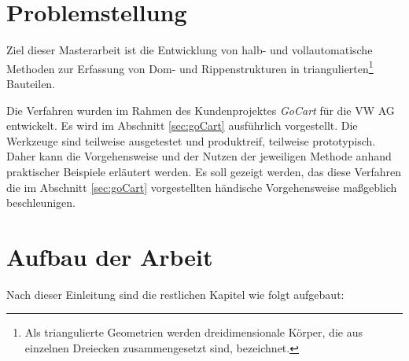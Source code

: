 \section{Problemstellung}
\label{problem}

Ziel dieser Masterarbeit ist die Entwicklung von halb- und vollautomatische Methoden zur Erfassung von Dom- und Rippenstrukturen in triangulierten\footnote{Als triangulierte Geometrien werden dreidimensionale K\"orper, die aus einzelnen Dreiecken zusammengesetzt sind, bezeichnet.} Bauteilen. 

Die Verfahren wurden im Rahmen des Kundenprojektes \textit{GoCart} f\"ur die VW AG entwickelt. Es wird im Abschnitt \ref{sec:goCart} ausf\"uhrlich vorgestellt. Die Werkzeuge sind teilweise ausgetestet und produktreif, teilweise prototypisch. Daher kann die Vorgehensweise und der Nutzen der jeweiligen Methode anhand praktischer Beispiele erl\"autert werden. Es soll gezeigt werden, das diese Verfahren die im Abschnitt \ref{sec:goCart} vorgestellten h\"andische Vorgehensweise ma{\ss}geblich beschleunigen.

\section{Aufbau der Arbeit}
Nach dieser Einleitung sind die restlichen Kapitel wie folgt aufgebaut:

